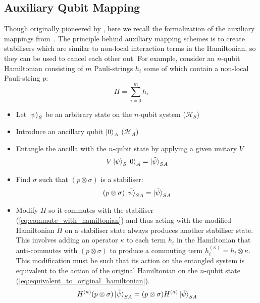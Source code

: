 \documentclass[pdftex,pra,aps,twocolumn,twoside]{revtex4-2}
\theoremstyle{plain}
\theoremstyle{note}
\newcommand\+{{\footnotesize \raisebox{0.3ex}{+}}}
\begin{document}
\subsection{Auxiliary Qubit Mapping}
\label{section:auxillaryMappings}
Though originally pioneered by \cite{Verstraete_2005}, here we recall the formalization of the auxiliary mappings from~\cite{steudtner2019quantum}. The principle behind auxiliary mapping schemes is to create stabilisers which are similar to non-local interaction terms in the Hamiltonian, so they can be used to cancel each other out. For example, consider an $n$-qubit Hamiltonian consisting of $m$ Pauli-strings $h_i$ some of which contain a non-local Pauli-string $p$:
\begin{equation}
    H = \sum_{i=0}^m h_i
\end{equation}
\begin{itemize}
\item Let $\ket{\psi}_S$ be an arbitrary state on the $n$-qubit system ($\mathcal{H}_S$)
\item Introduce an ancillary qubit $\ket{0}_A$ ($\mathcal{H}_A$)
\item Entangle the ancilla with the $n$-qubit state by applying a given unitary $V$
\begin{equation}
    V \ket{\psi}_S \ket{0}_A = \ket{\tilde \psi}_{SA}
\end{equation}
\item Find $\sigma$ such that $(p \otimes \sigma)$ is a stabiliser:
\begin{equation}
    (p \otimes \sigma) \ket{\tilde \psi}_{SA} = \ket{\tilde \psi}_{SA}
\end{equation}
\item Modify $H$ so it commutes with the stabiliser (\ref{eq:commute_with_hamiltonian}) and thus acting with the modified Hamiltonian $\tilde H$ on a stabiliser state always produces another stabiliser state. This involves adding an operator $\kappa$ to each term $h_i$ in the Hamiltonian that anti-commutes with $(p \otimes \sigma)$ to produce a commuting term $h_i^{(\kappa)} = h_i \otimes \kappa$. This modification must be such that its action on the entangled system is equivalent to the action of the original Hamiltonian on the $n$-qubit state (\ref{eq:equivalent_to_original_hamiltonian}).
\begin{equation}
\label{eq:commute_with_hamiltonian}
    H^{(\kappa)}(p \otimes \sigma)  \ket{\tilde \psi}_{SA} =(p \otimes \sigma)  H^{(\kappa)}\ket{\tilde \psi}_{SA}  
\end{equation}

\end{itemize}
\end{document}
